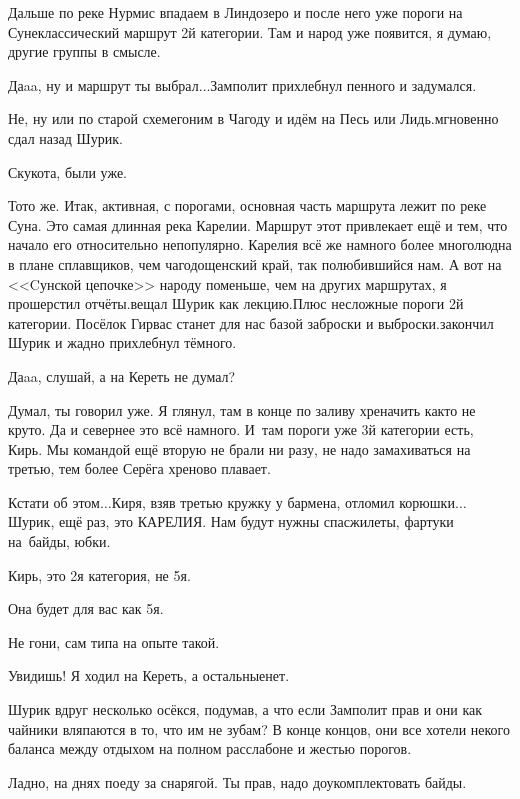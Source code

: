 \diagdash Дальше по реке Нурмис впадаем в Линдозеро и после него уже пороги на Суне\mdash классический маршрут 2\sdash й категории. Там и народ уже появится, я думаю, другие группы в смысле.

\diagdash Да\sdash a\sdash a, ну и маршрут ты выбрал$\ldots$\mdash Замполит прихлебнул пенного и задумался.

\diagdash Не, ну или по старой схеме\mdash гоним в Чагоду и идём на Песь или Лидь.\mdash мгновенно сдал назад Шурик.

\diagdash Скукота, были уже.

\diagdash То\sdash то же. Итак, активная, с порогами, основная часть маршрута лежит по реке Суна. Это самая длинная река Карелии. Маршрут этот привлекает ещё и тем, что начало его относительно непопулярно. Карелия всё же намного более многолюдна в плане сплавщиков, чем чагодощенский край, так полюбившийся нам. А вот на <<Cунской цепочке>> народу поменьше, чем на других маршрутах, я прошерстил отчёты.\mdash вещал Шурик как лекцию.\mdash Плюс несложные пороги 2\sdash й категории. Посёлок Гирвас станет для нас базой заброски и выброски.\mdash закончил Шурик и жадно прихлебнул тёмного.

\diagdash Да\sdash a\sdash a, слушай, а на Кереть не думал?

\diagdash Думал, ты говорил уже. Я глянул, там в конце по заливу хреначить как\sdash то не круто. Да и севернее это всё намного. И~там пороги уже 3\sdash й категории есть, Кирь. Мы командой ещё вторую не брали ни разу, не надо замахиваться на третью, тем более Серёга хреново плавает. 

\diagdash Кстати об этом$\ldots$\mdash Киря, взяв третью кружку у бармена, отломил корюшки\mdash $\ldots$Шурик, ещё раз, это КАРЕЛИЯ. Нам будут нужны спасжилеты, фартуки на~байды, юбки.

\diagdash Кирь, это 2\sdash я категория, не 5\sdash я.

\diagdash Она будет для вас как 5\sdash я.

\diagdash Не гони, сам типа на опыте такой.

\diagdash Увидишь! Я ходил на Кереть, а остальные\mdash нет.

Шурик вдруг несколько осёкся, подумав, а что если Замполит прав и они как чайники вляпаются в то, что им не зубам? В конце концов, они все хотели некого баланса между отдыхом на полном расслабоне и жестью порогов.

\diagdash Ладно, на днях поеду за снарягой. Ты прав, надо доукомплектовать байды.

